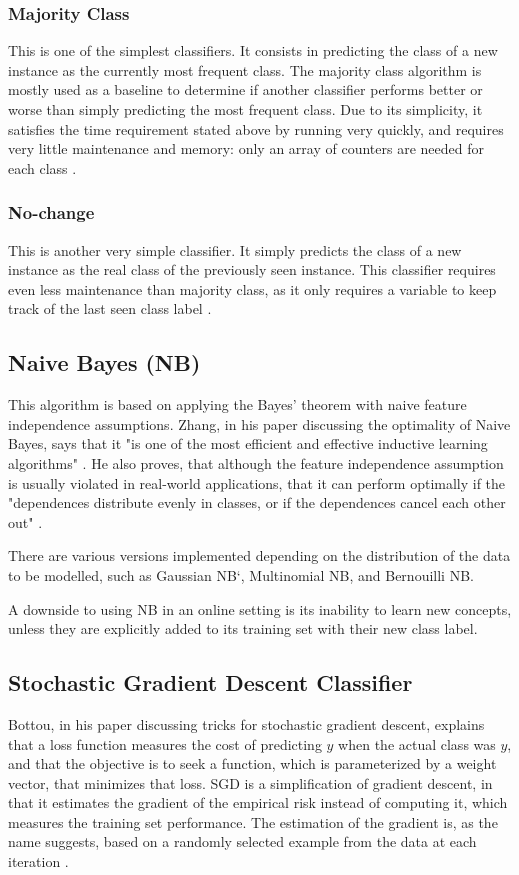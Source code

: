 \subsubsection{Majority Class}
This is one of the simplest classifiers. It consists in predicting the class of a new instance as the currently most frequent class. The majority class algorithm is mostly used as a baseline to determine if another classifier performs better or worse than simply predicting the most frequent class. Due to its simplicity, it satisfies the time requirement stated above by running very quickly, and requires very little maintenance and memory: only an array of counters are needed for each class \cite{bifet2018machine}.

\subsubsection{No-change}
This is another very simple classifier. It simply predicts the class of a new instance as the real class of the previously seen instance. This classifier requires even less maintenance than majority class, as it only requires a variable to keep track of the last seen class label \cite{bifet2018machine}.

\subsection{Naive Bayes (NB)}
This algorithm is based on applying the Bayes' theorem with naive feature independence assumptions. Zhang, in his paper discussing the optimality of Naive Bayes, says that it "is one of the most efficient and effective inductive learning algorithms" \cite{zhang2004optimality}. He also proves, that although the feature independence assumption is usually violated in real-world applications, that it can perform optimally if the "dependences distribute evenly in classes, or if the dependences cancel each other out" \cite{zhang2004optimality}.

There are various versions implemented depending on the distribution of the data to be modelled, such as Gaussian NB`, Multinomial NB, and Bernouilli NB.

A downside to using NB in an online setting is its inability to learn new concepts, unless they are explicitly added to its training set with their new class label.

\subsection{Stochastic Gradient Descent Classifier}
Bottou, in his paper discussing tricks for stochastic gradient descent, explains that a loss function measures the cost of predicting $\hat{y}$ when the actual class was $y$, and that the objective is to seek a function, which is parameterized by a weight vector, that minimizes that loss.
SGD is a simplification of gradient descent, in that it estimates the gradient of the empirical risk instead of computing it, which measures the training set performance. The estimation of the gradient is, as the name suggests, based on a randomly selected example from the data at each iteration \cite{bottou2012stochastic}.

